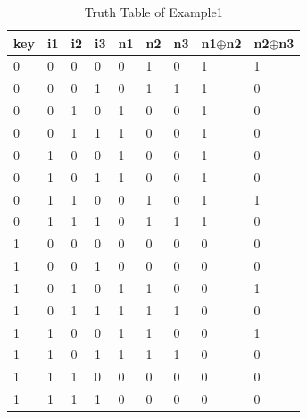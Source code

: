 \documentclass[10pt, conference]{IEEEtran}
\begin{document}
\begin{table}[htb!]
\centering
\begin{tabular}{|l|l|l|l|l|l|l|l|l|}
\hline
key & i1 & i2 & i3 & n1 & n2 & n3 & n1$\oplus$n2 & n2$\oplus$n3 \\ \hline\hline
0   & 0  & 0  & 0  & 0  & 1  & 0  & 1                     & 1                     \\ \hline
0   & 0  & 0  & 1  & 0  & 1  & 1  & 1                     & 0                     \\ \hline
0   & 0  & 1  & 0  & 1  & 0  & 0  & 1                     & 0                     \\ \hline
0   & 0  & 1  & 1  & 1  & 0  & 0  & 1                     & 0                     \\ \hline
0   & 1  & 0  & 0  & 1  & 0  & 0  & 1                     & 0                     \\ \hline
0   & 1  & 0  & 1  & 1  & 0  & 0  & 1                     & 0                     \\ \hline
0   & 1  & 1  & 0  & 0  & 1  & 0  & 1                     & 1                     \\ \hline
0   & 1  & 1  & 1  & 0  & 1  & 1  & 1                     & 0                     \\ \hline\hline
1   & 0  & 0  & 0  & 0  & 0  & 0  & 0                     & 0                     \\ \hline
1   & 0  & 0  & 1  & 0  & 0  & 0  & 0                     & 0                     \\ \hline
1   & 0  & 1  & 0  & 1  & 1  & 0  & 0                     & 1                     \\ \hline
1   & 0  & 1  & 1  & 1  & 1  & 1  & 0                     & 0                     \\ \hline
1   & 1  & 0  & 0  & 1  & 1  & 0  & 0                     & 1                     \\ \hline
1   & 1  & 0  & 1  & 1  & 1  & 1  & 0                     & 0                     \\ \hline
1   & 1  & 1  & 0  & 0  & 0  & 0  & 0                     & 0                     \\ \hline
1   & 1  & 1  & 1  & 0  & 0  & 0  & 0                     & 0                     \\ \hline
\end{tabular}
\caption{Truth Table of Example1}
\label{table:truth}
\end{table}
\end{document}
